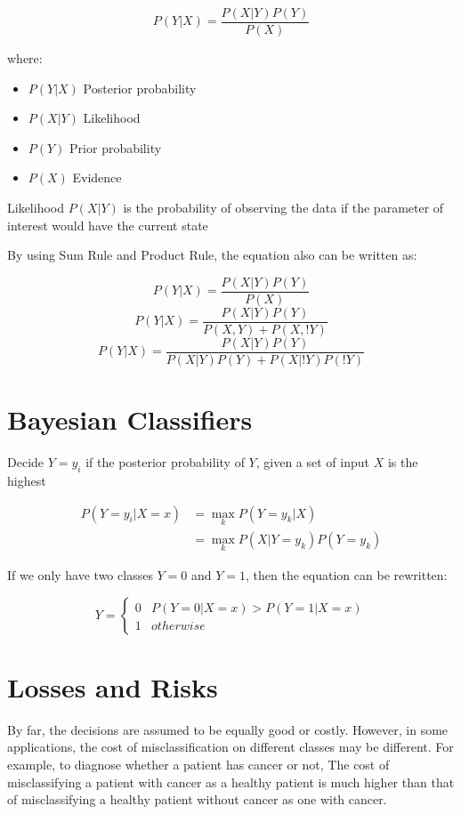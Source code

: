 \begin{multicols}{2}
$$P(Y|X)= \frac{P(X|Y) P(Y)}{P(X)}$$

\noindent where:
\begin{itemize}
    \item $P(Y|X)$ Posterior probability
    \item $P(X|Y)$ Likelihood
    \item $P(Y)$ Prior probability
    \item $P(X)$ Evidence
\end{itemize}

\noindent Likelihood $P(X|Y)$ is the probability of observing the data if the parameter of interest would have the current state

\noindent By using Sum Rule and Product Rule, the equation also can be written as:

$$P(Y|X)= \frac{P(X|Y) P(Y)}{P(X)}$$
$$P(Y|X)= \frac{P(X|Y) P(Y)}{P(X,Y)+P(X,!Y)}$$
$$P(Y|X)= \frac{P(X|Y) P(Y)}{P(X|Y)P(Y)+P(X|!Y)P(!Y)}$$

\section{Bayesian Classifiers}

\noindent Decide $Y=y_{i}$ if the posterior probability of $Y$, given a set of input $X$ is the highest

\begin{equation*}
\begin{split}
    P(Y=y_{i}|X=x) &= \!\max_{k} P(Y=y_{k}|X) \\
    &= \!\max_{k} P(X | Y = y_k) P(Y= y_k)
\end{split}
\end{equation*}

\noindent If we only have two classes $Y=0$ and $Y=1$, then the equation can be rewritten:

$$
Y = 
\begin{cases}
0 & P(Y=0|X=x) > P(Y=1|X=x)\\
1 & otherwise
\end{cases}
$$

\section{Losses and Risks}

\noindent By far, the decisions are assumed to be equally good or costly. However, in some applications, the cost of misclassification on different classes may be different. For example, to diagnose whether a patient has cancer or not, The cost of misclassifying a patient with cancer as a healthy patient is much higher than that of misclassifying a healthy patient without cancer as one with cancer.


\end{multicols}
